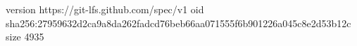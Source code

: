 version https://git-lfs.github.com/spec/v1
oid sha256:27959632d2ca9a8da262fadcd76beb66aa071555f6b901226a045c8e2d53b12c
size 4935
